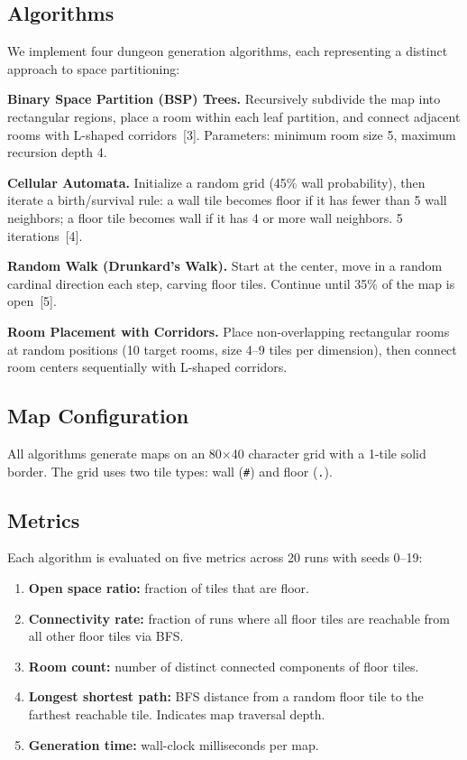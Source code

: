 \documentclass[11pt,a4paper]{article}
\begin{document}
\subsection{Algorithms}

We implement four dungeon generation algorithms, each representing a distinct approach to space partitioning:

\textbf{Binary Space Partition (BSP) Trees.} Recursively subdivide the map into rectangular regions, place a room within each leaf partition, and connect adjacent rooms with L-shaped corridors~[3]. Parameters: minimum room size 5, maximum recursion depth 4.

\textbf{Cellular Automata.} Initialize a random grid (45\% wall probability), then iterate a birth/survival rule: a wall tile becomes floor if it has fewer than 5 wall neighbors; a floor tile becomes wall if it has 4 or more wall neighbors. 5 iterations~[4].

\textbf{Random Walk (Drunkard's Walk).} Start at the center, move in a random cardinal direction each step, carving floor tiles. Continue until 35\% of the map is open~[5].

\textbf{Room Placement with Corridors.} Place non-overlapping rectangular rooms at random positions (10 target rooms, size 4--9 tiles per dimension), then connect room centers sequentially with L-shaped corridors.

\subsection{Map Configuration}

All algorithms generate maps on an 80$\times$40 character grid with a 1-tile solid border. The grid uses two tile types: wall (\texttt{\#}) and floor (\texttt{.}).

\subsection{Metrics}

Each algorithm is evaluated on five metrics across 20 runs with seeds 0--19:

\begin{enumerate}
    \item \textbf{Open space ratio:} fraction of tiles that are floor.
    \item \textbf{Connectivity rate:} fraction of runs where all floor tiles are reachable from all other floor tiles via BFS.
    \item \textbf{Room count:} number of distinct connected components of floor tiles.
    \item \textbf{Longest shortest path:} BFS distance from a random floor tile to the farthest reachable tile. Indicates map traversal depth.
    \item \textbf{Generation time:} wall-clock milliseconds per map.
\end{enumerate}
\end{document}

